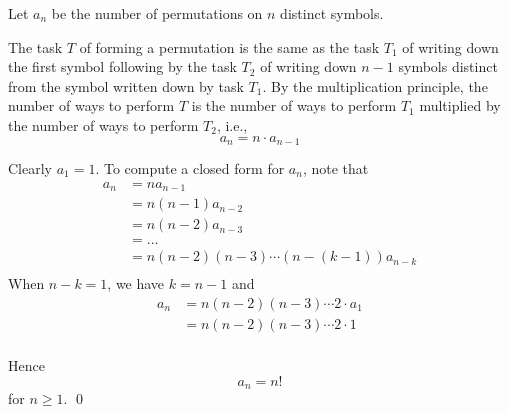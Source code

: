 Let $a_n$ be the number of permutations on $n$ distinct symbols.

The task $T$ of forming a permutation is
the same as the task $T_1$ of writing down the first symbol
following by the task $T_2$ of writing down $n - 1$ symbols distinct
from the symbol written down by task $T_1$.
By the multiplication principle,
the number of ways to perform $T$ is the number of ways to perform
$T_1$ multiplied by the number of ways to perform $T_2$, i.e.,
\[
a_n = n \cdot a_{n - 1}
\]

Clearly $a_1 = 1$.
To compute a closed form for $a_n$, note that
\begin{align*}
  a_n
  &= n a_{n - 1} \\
  &= n (n - 1) a_{n - 2} \\
  &= n (n - 2) a_{n - 3} \\
  &= ... \\
  &= n (n - 2)(n - 3)\cdots(n - (k - 1)) a_{n - k} \\
\end{align*}
When $n - k = 1$, we have $k = n - 1$ and 
\begin{align*}
  a_n
  &= n (n - 2)(n - 3)\cdots 2 \cdot a_1 \\
  &= n (n - 2)(n - 3)\cdots 2 \cdot 1 \\
\end{align*}

Hence
\[
a_n = n!
\]
for $n \geq 1$.
\qed
